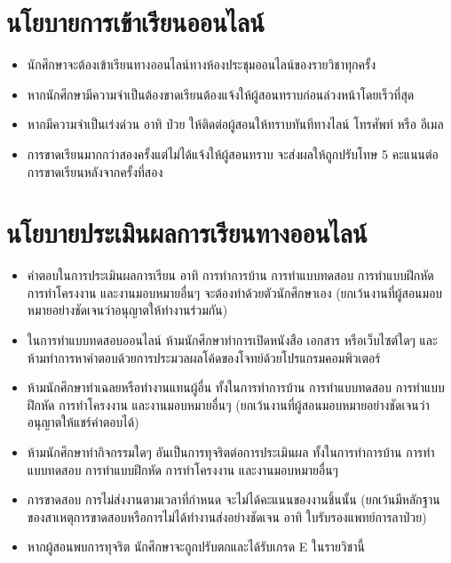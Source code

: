 \section*{นโยบายการเข้าเรียนออนไลน์}
\begin{tcolorbox}[breakable,enhanced,fonttitle=\bfseries,colback=myblue!05,colframe=myblue]
\begin{itemize}
\item นักศึกษาจะต้องเข้าเรียนทางออนไลน์ทางห้องประชุมออนไลน์ของรายวิชาทุกครั้ง
\item หากนักศึกษามีความจำเป็นต้องขาดเรียนต้องแจ้งให้ผู้สอนทราบก่อนล่วงหน้าโดยเร็วที่สุด
\item หากมีความจำเป็นเร่งด่วน อาทิ ป่วย ให้ติดต่อผู้สอนให้ทราบทันทีทางไลน์ โทรศัพท์ หรือ อีเมล  
\item การขาดเรียนมากกว่าสองครั้งแต่ไม่ได้แจ้งให้ผู้สอนทราบ จะส่งผลให้ถูกปรับโทษ 5 คะแนนต่อการขาดเรียนหลังจากครั้งที่สอง
\end{itemize}
\end{tcolorbox}

\section*{นโยบายประเมินผลการเรียนทางออนไลน์}
\begin{tcolorbox}[breakable,enhanced,fonttitle=\bfseries,colback=myblue!05,colframe=myblue]
\begin{itemize}
\item คำตอบในการประเมินผลการเรียน อาทิ การทำการบ้าน การทำแบบทดสอบ การทำแบบฝึกหัด การทำโครงงาน และงานมอบหมายอื่นๆ จะต้องทำด้วยตัวนักศึกษาเอง (ยกเว้นงานที่ผู้สอนมอบหมายอย่างชัดเจนว่าอนุญาตให้ทำงานร่วมกัน)
\item ในการทำแบบทดสอบออนไลน์ ห้ามนักศึกษาทำการเปิดหนังสือ เอกสาร หรือเว็บไซต์ใดๆ และห้ามทำการหาคำตอบด้วยการประมวลผลโค้ดของโจทย์ด้วยโปรแกรมคอมพิวเตอร์
\item ห้ามนักศึกษาทำเฉลยหรือทำงานแทนผู้อื่น ทั้งในการทำการบ้าน การทำแบบทดสอบ การทำแบบฝึกหัด การทำโครงงาน และงานมอบหมายอื่นๆ (ยกเว้นงานที่ผู้สอนมอบหมายอย่างชัดเจนว่าอนุญาตให้แชร์คำตอบได้)
\item ห้ามนักศึกษาทำกิจกรรมใดๆ อันเป็นการทุจริตต่อการประเมินผล  ทั้งในการทำการบ้าน การทำแบบทดสอบ การทำแบบฝึกหัด การทำโครงงาน และงานมอบหมายอื่นๆ 
\item การขาดสอบ การไม่ส่งงานตามเวลาที่กำหนด จะไม่ได้คะแนนของงานชิ้นนั้น (ยกเว้นมีหลักฐานของสาเหตุการขาดสอบหรือการไม่ได้ทำงานส่งอย่างชัดเจน อาทิ ใบรับรองแพทย์การลาป่วย)
\item หากผู้สอนพบการทุจริต นักศึกษาจะถูกปรับตกและได้รับเกรด E ในรายวิชานี้
\end{itemize}
\end{tcolorbox}

